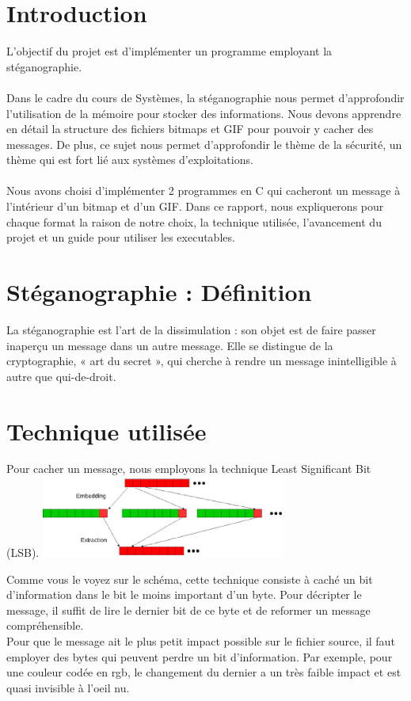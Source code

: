 \section{Introduction}
L'objectif du projet est d'implémenter un programme employant la stéganographie.\\\\
Dans le cadre du cours de Systèmes, la stéganographie nous permet d'approfondir l'utilisation de la mémoire pour stocker des informations. Nous devons apprendre en détail la structure des fichiers bitmaps et GIF pour pouvoir y cacher des messages. De plus, ce sujet nous permet d'approfondir le thème de la sécurité, un thème qui est fort lié aux systèmes d'exploitations.\\\\
Nous avons choisi d'implémenter 2 programmes en C qui cacheront un message à l'intérieur d'un bitmap et d'un GIF. Dans ce rapport, nous expliquerons pour chaque format la raison de notre choix, la technique utilisée, l'avancement du projet et un guide pour utiliser les executables. 
\section{Stéganographie : Définition}
La stéganographie est l'art de la dissimulation : son objet est de faire passer inaperçu un message dans un autre message. Elle se distingue de la cryptographie, « art du secret », qui cherche à rendre un message inintelligible à autre que qui-de-droit.\\

\section {Technique utilisée}
Pour cacher un message, nous employons la technique Least Significant Bit (LSB). 
\includegraphics[width=8cm]{lsb.eps}

Comme vous le voyez sur le schéma, cette technique consiste à caché un bit d'information dans le bit le moins important d'un byte. Pour décripter le message, il suffit de lire le dernier bit de ce byte et de reformer un message compréhensible.\\
Pour que le message ait le plus petit impact possible sur le fichier source, il faut employer des bytes qui peuvent perdre un bit d'information. Par exemple, pour une couleur codée en rgb, le changement du dernier a un très faible impact et est quasi invisible à l'oeil nu.
